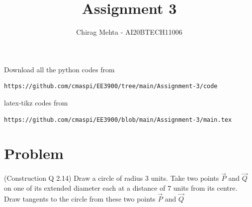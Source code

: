 \documentclass[journal,12pt,twocolumn]{IEEEtran}
\begin{document}
     \def\rightbox#1{\makebox[0in][r]{#1}}
     \def\centbox#1{\makebox[0in]{#1}}
     \def\topbox#1{\raisebox{-\baselineskip}[0in][0in]{#1}}
     \def\midbox#1{\raisebox{-0.5\baselineskip}[0in][0in]{#1}}
\vspace{3cm}
\title{Assignment 3}
\author{Chirag Mehta - AI20BTECH11006}
\maketitle
\newpage
\bigskip
\renewcommand{\thefigure}{\theenumi}
\renewcommand{\thetable}{\theenumi}
Download all the python codes from
\begin{lstlisting}
https://github.com/cmaspi/EE3900/tree/main/Assignment-3/code
\end{lstlisting}
latex-tikz codes from 
\begin{lstlisting}
https://github.com/cmaspi/EE3900/blob/main/Assignment-3/main.tex
\end{lstlisting}
\section{Problem}
(Construction Q 2.14) Draw a circle of radius 3 units.
Take two points $\vec{P}$ and $\vec{Q}$ on one of its extended 
diameter each at a distance of $7$ units from its centre.
Draw tangents to the circle from these two points $\vec{P}$ and $\vec{Q}$ 
\end{document}
